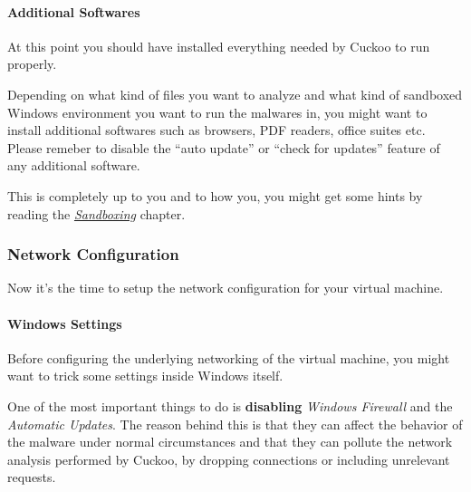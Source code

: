 \documentclass[letterpaper,10pt,english]{sphinxmanual}
\begin{document}
\paragraph{Additional Softwares}
\label{installation/guest/requirements:additional-softwares}\label{installation/guest/requirements:winappdbg}
At this point you should have installed everything needed by Cuckoo to run
properly.

Depending on what kind of files you want to analyze and what kind of sandboxed
Windows environment you want to run the malwares in, you might want to install
additional softwares such as browsers, PDF readers, office suites etc.
Please remeber to disable the ``auto update'' or ``check for updates'' feature of
any additional software.

This is completely up to you and to how you, you might get some hints by reading
the {\hyperref[introduction/sandboxing::doc]{\emph{Sandboxing}}} chapter.


\subsubsection{Network Configuration}
\label{installation/guest/network:network-configuration}\label{installation/guest/network::doc}
Now it's the time to setup the network configuration for your virtual machine.


\paragraph{Windows Settings}
\label{installation/guest/network:windows-settings}
Before configuring the underlying networking of the virtual machine, you might
want to trick some settings inside Windows itself.

One of the most important things to do is \textbf{disabling} \emph{Windows Firewall} and the
\emph{Automatic Updates}. The reason behind this is that they can affect the behavior
of the malware under normal circumstances and that they can pollute the network
analysis performed by Cuckoo, by dropping connections or including unrelevant
requests.
\end{document}

